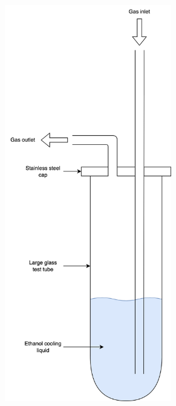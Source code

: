 \begin{figure}
    \centering
    \begin{subfigure}[b]{0.475\textwidth}
        \centering
        \includegraphics[width=0.8\textwidth]{chapter_6/figures/condenser_design_1.png}
        \caption{}
        \label{fig:condenser_design_1}
    \end{subfigure}

\end{figure}
